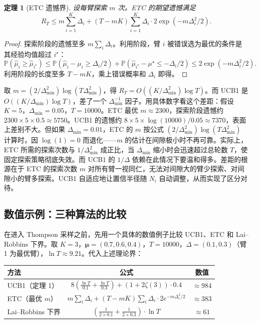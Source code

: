 \documentclass[UTF8,a4paper,11pt,zihao=5]{ctexart}
\newtheorem{theorem}{定理}[section]
\newcommand{\Pbb}{\mathbb{P}}
\newcommand{\regret}[1]{R_{#1}}
\begin{document}
\begin{theorem}[ETC 遗憾界]
设每臂探索 $m$ 次。ETC 的期望遗憾满足
\begin{equation}
    \regret{T} \leq m\sum_{i=1}^{K} \Delta_i + (T - mK)\sum_{i=1}^{K} \Delta_i \cdot 2\exp(-m \Delta_i^2 / 2).
\end{equation}
\end{theorem}

\begin{proof}
探索阶段的遗憾至多 $m\sum_i \Delta_i$。利用阶段，臂 $i$ 被错误选为最优的条件是其经验均值超过 $i^\star$：
\begin{equation}
    \Pbb(\hat{\mu}_i \ge \hat{\mu}_{i^\star})
    \le \Pbb(\hat{\mu}_i - \mu_i \ge \Delta_i/2) + \Pbb(\hat{\mu}_{i^\star} - \mu^\star \le -\Delta_i/2)
    \le 2\exp(-m\Delta_i^2 / 2).
\end{equation}
利用阶段的长度至多 $T-mK$，乘上错误概率和 $\Delta_i$ 即得。
\end{proof}

取 $m = (2/\Delta_{\min}^2)\log(T\Delta_{\min}^2)$，得 $\regret{T} = O((K/\Delta_{\min}^2)\log T)$。而 UCB1 是 $O((K/\Delta_{\min})\log T)$，差了一个 $\Delta_{\min}^{-1}$ 因子。用具体数字看这个差距：假设 $K=5$，$\Delta_{\min}=0.05$，$T=10000$。ETC 最优 $m \approx 2300$，探索阶段遗憾约 $2300 \times 5 \times 0.5 \approx 5750$。UCB1 的遗憾约 $8 \times 5 \times \log(10000) / 0.05 \approx 7370$，表面上差别不大。但如果 $\Delta_{\min}=0.01$，ETC 的 $m$ 按公式 $(2/\Delta_{\min}^2)\log(T\Delta_{\min}^2)$ 计算时，因 $\log(1)=0$ 而退化——$m$ 的估计在间隙极小时不再可靠。实际上，ETC 所需的探索次数与 $1/\Delta_{\min}^2$ 成正比，当 $\Delta_{\min}$ 缩小时会迅速超过总轮数 $T$，使固定探索策略彻底失效。而 UCB1 的 $1/\Delta$ 依赖在此情况下要温和得多。差距的根源在于 ETC 的探索次数 $m$ 对所有臂一视同仁，无法对间隙大的臂少探索、对间隙小的臂多探索。UCB1 自适应地让置信半径随 $N_i$ 自动调整，从而实现了区分对待。

\subsection{数值示例：三种算法的比较}

在进入 Thompson 采样之前，先用一个具体的数值例子比较 UCB1、ETC 和 Lai--Robbins 下界。取 $K=3$，$\bm{\mu} = (0.7, 0.6, 0.4)$，$T=10000$，$\Delta = (0.1, 0.3)$（臂 1 为最优臂），$\ln T \approx 9.21$。代入上述理论界：

\begin{center}
\begin{tabular}{@{}lcc@{}}
\toprule
\textbf{方法} & \textbf{公式} & \textbf{数值} \\
\midrule
UCB1（定理 1）  & $8(\frac{\ln T}{0.1} + \frac{\ln T}{0.3}) + (1+2\zeta(3)) \cdot 0.4$ & $\approx 984$ \\
ETC（最优 $m$） & $m\sum_i\Delta_i + (T-mK)\sum_i\Delta_i\cdot 2e^{-m\Delta_i^2/2}$ & $\approx 383$ \\
Lai--Robbins 下界 & $(\frac{1}{2 \times 0.1} + \frac{1}{2 \times 0.3}) \cdot \ln T$ & $\approx 61$ \\
\bottomrule
\end{tabular}
\end{center}
\end{document}
